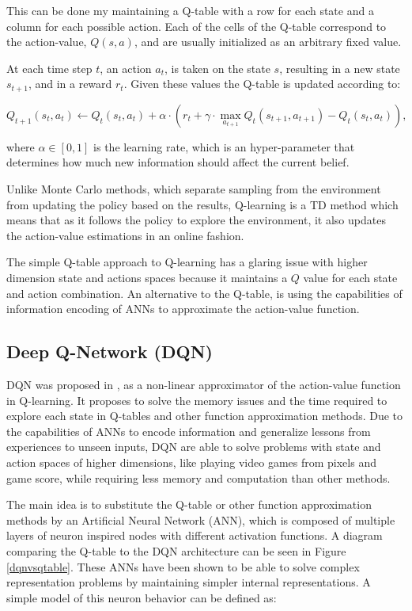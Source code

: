 This can be done my maintaining a Q-table with a row for each state and a column for each possible action. Each of the cells of the Q-table correspond to the action-value, $Q(s,a)$, and are usually initialized as an arbitrary fixed value. 

At each time step $t$, an action $a_t$, is taken on the state $s$, resulting in a new state $s_{t+1}$, and in a reward $r_t$. Given these values the Q-table is updated according to: 

\begin{equation}
    Q_{t+1}(s_t, a_t) \leftarrow Q_{t}(s_t, a_t) + \alpha \cdot (r_t + \gamma \cdot \max\limits_{a_{t+1}}Q_t(s_{t+1}, a_{t+1}) - Q_t(s_t, a_t)) ,
\end{equation}

where $\alpha \in [0, 1]$ is the learning rate, which is an hyper-parameter that determines how much new information should affect the current belief.

Unlike Monte Carlo methods, which separate sampling from the environment from updating the policy based on the results, Q-learning is a \acrfull{TD} method which means that as it follows the policy to explore the environment, it also updates the action-value estimations in an online fashion.

The simple Q-table approach to Q-learning has a glaring issue with higher dimension state and actions spaces because it maintains a $Q$ value for each state and action combination. An alternative to the Q-table, is using the capabilities of information encoding of \acrfull{ANNs} to approximate the action-value function.

\subsection{Deep Q-Network (DQN)}
\noindent \acrshort{DQN} was proposed in \cite{DQN}, as a non-linear approximator of the action-value function in Q-learning. It proposes to solve the memory issues and the time required to explore each state in Q-tables and other function approximation methods. Due to the capabilities of \acrshort{ANNs} to encode information and generalize lessons from experiences to unseen inputs, \acrshort{DQN} are able to solve problems with state and action spaces of higher dimensions, like playing video games from pixels and game score, while requiring less memory and computation than other methods.

The main idea is to substitute the Q-table or other function approximation methods by an Artificial Neural Network (ANN), which is composed of multiple layers of neuron inspired nodes with different activation functions. A diagram comparing the Q-table to the \acrshort{DQN} architecture can be seen in Figure \ref{dqnvsqtable}. These \acrshort{ANNs} have been shown to be able to solve complex representation problems by maintaining simpler internal representations. A simple model of this neuron behavior can be defined as:

